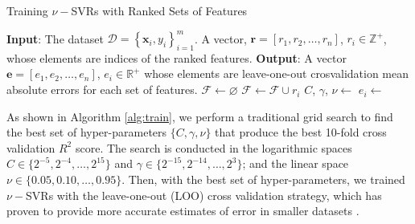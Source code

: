 \documentclass{bmcart}
\begin{document}
\begin{algorithm}[t]
\caption{Training $\nu-$SVRs with Ranked Sets of Features}\label{alg:train}
\begin{algorithmic}[1]
\Statex \textbf{Input}: The dataset $\mathcal{D}=\left\{ \mathbf{x}_i, y_i \right\}_{i=1}^m$. 
A vector, $\mathbf{r}=[r_1, r_2, \dots, r_n]$, $r_i \in \mathbb{Z}^+$, 
whose elements are indices of the ranked features.
\Statex \textbf{Output}: A vector $\mathbf{e}=[e_1, e_2, \dots, e_n]$, 
$e_i \in \mathbb{R}^+$ whose elements are leave-one-out 
crosvalidation mean absolute errors for each set of features.
\State $\mathcal{F} \gets \varnothing$ 
\State $\mathcal{F} \gets \mathcal{F} \cup r_i$
\State $C$, $\gamma$, $\nu \gets$ 
\State $e_i \gets$
\EndFor
\end{algorithmic}
\end{algorithm}

As shown in Algorithm \ref{alg:train}, we perform a traditional grid search to
find the best set of hyper-parameters $\{C,\gamma,\nu\}$ that produce the best
10-fold cross validation $R^2$ score. The search is conducted in the logarithmic 
spaces $C \in \{2^{-5}, 2^{-4}, \dots, 2^{15}\}$ and $\gamma \in \{2^{-15},
2^{-14}, \dots, 2^{3}\}$; and the linear space $\nu \in \{0.05, 0.10, \dots, 0.95\}$. 
Then, with the best set of hyper-parameters, we trained $\nu-$SVRs with the
leave-one-out (LOO) cross validation strategy, which has proven to provide more
accurate estimates of error in smaller datasets \cite{wong2015performance}.  
\end{document}
